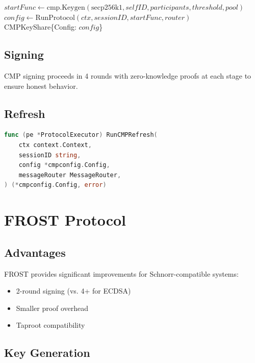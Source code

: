 \documentclass[11pt,twocolumn]{article}
\begin{document}
\begin{algorithm}
\caption{CMP Key Generation}
\label{alg:cmp-keygen}
\begin{algorithmic}[1]
    \State $startFunc \gets \text{cmp.Keygen}(\text{secp256k1}, selfID, participants, threshold, pool)$
    \State $config \gets \text{RunProtocol}(ctx, sessionID, startFunc, router)$
    \State \Return CMPKeyShare\{Config: $config$\}
\EndProcedure
\end{algorithmic}
\end{algorithm}

\subsection{Signing}

CMP signing proceeds in 4 rounds with zero-knowledge proofs at each stage to ensure honest behavior.

\subsection{Refresh}

\begin{lstlisting}[language=Go,basicstyle=\ttfamily\small]
func (pe *ProtocolExecutor) RunCMPRefresh(
    ctx context.Context,
    sessionID string,
    config *cmpconfig.Config,
    messageRouter MessageRouter,
) (*cmpconfig.Config, error)
\end{lstlisting}

\section{FROST Protocol}

\subsection{Advantages}

FROST provides significant improvements for Schnorr-compatible systems:

\begin{itemize}
\item 2-round signing (vs. 4+ for ECDSA)
\item Smaller proof overhead
\item Taproot compatibility
\end{itemize}

\subsection{Key Generation}
\end{document}
